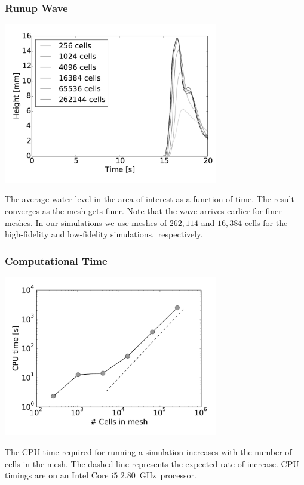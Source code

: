 \documentclass[11pt,ucs]{beamer}
\begin{document}
\begin{frame}\frametitle{Runup Wave}

\begin{center}
\includegraphics[width=0.7\textwidth]{mesh_convergence_height}
\end{center}


\small{
The average water level in the area of interest as a function of time. The result converges as the mesh gets finer. Note that  the wave arrives earlier for finer meshes. In our simulations we use meshes of $262,\!114$ and $16,\!384$ cells for the high-fidelity and low-fidelity \mbox{simulations, respectively.}}



\end{frame}

\begin{frame}\frametitle{Computational Time}

\begin{center}
\includegraphics[width=0.7\textwidth]{mesh_convergence_time}
\end{center}

\small{
The CPU time required for running a simulation increases with the number of cells in the mesh. The dashed line represents the expected rate of increase. CPU timings are on an Intel Core i$5$ \mbox{$2.80$ GHz processor.}}

\end{frame}
\end{document}
